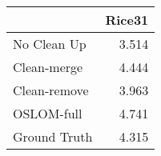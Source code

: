 \begin{tabular}{lr}
\toprule
{} & Rice31 \\
\midrule
No Clean Up  &  3.514 \\
Clean-merge  &  4.444 \\
Clean-remove &  3.963 \\
OSLOM-full   &  4.741 \\
Ground Truth &  4.315 \\
\bottomrule
\end{tabular}

